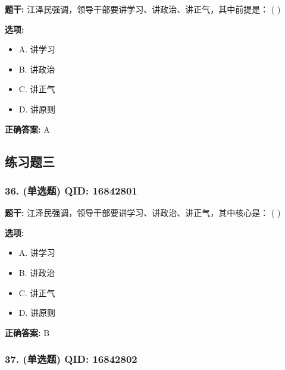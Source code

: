 \documentclass[12pt,UTF8]{ctexart}
\begin{document}
\textbf{题干:}
江泽民强调，领导干部要讲学习、讲政治、讲正气，其中前提是： ( )

\textbf{选项:}
\begin{itemize}[leftmargin=*]

  \item A. 讲学习

  \item B. 讲政治

  \item C. 讲正气

  \item D. 讲原则

\end{itemize}

\textbf{正确答案:}
A

\vspace{0.3em}\hrulefill\vspace{0.7em}

\subsection*{练习题三}

\subsubsection*{36. (单选题) \small QID: 16842801}

\textbf{题干:}
江泽民强调，领导干部要讲学习、讲政治、讲正气，其中核心是： ( )

\textbf{选项:}
\begin{itemize}[leftmargin=*]

  \item A. 讲学习

  \item B. 讲政治

  \item C. 讲正气

  \item D. 讲原则

\end{itemize}

\textbf{正确答案:}
B

\vspace{0.3em}\hrulefill\vspace{0.7em}

\subsubsection*{37. (单选题) \small QID: 16842802}
\end{document}
